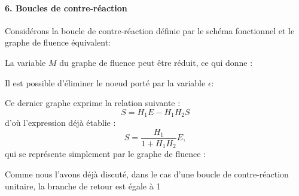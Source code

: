 \paragraph{6. Boucles de contre-réaction}
Considérons la boucle de contre-réaction définie par le schéma fonctionnel et 
le graphe de fluence équivalent:
\begin{center}
    
\end{center}
La variable $M$ du graphe de fluence peut être réduit, ce qui donne :
\begin{center}
    
\end{center}
Il est possible d'éliminer le noeud porté par la variable $\epsilon$:
\begin{center}
    
\end{center}
Ce dernier graphe exprime la relation suivante :
\[
S=H_1E-H_1H_2S
\]
d'où l'expression déjà établie :
\[
    S=\dfrac{H_1}{1+H_1H_2}E,
\]
qui se représente simplement par le graphe de fluence :
\begin{center}
    
\end{center}
Comme nous l'avons déjà discuté, dans le cas d'une boucle 
de contre-réaction unitaire, la branche de retour est égale à 1
\begin{center}
    
\end{center}
